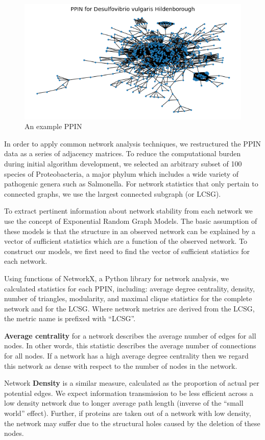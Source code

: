\documentclass[12pt]{article}
\begin{document}
\begin{figure}
\centering
  \includegraphics[width=.5\linewidth]{PPIN_fig1}
  \caption{An example PPIN}
  \label{fig:PPIN_fig1}
\end{figure}

In order to apply common network analysis techniques, we restructured the PPIN data as a series of adjacency matrices. To reduce the computational burden during initial algorithm development, we selected an arbitrary subset of 100 species of Proteobacteria, a major phylum which includes a wide variety of pathogenic genera such as Salmonella. For network statistics that only pertain to connected graphs, we use the largest connected subgraph (or LCSG).

To extract pertinent information about network stability from each network we use the concept of Exponential Random Graph Models. The basic assumption of these models is that the structure in an observed network can be explained by a vector of sufficient statistics which are a function of the observed network. To construct our models, we first need to find the vector of sufficient statistics for each network.

Using functions of NetworkX, a Python library for network analysis, we calculated statistics for each PPIN, including: average degree centrality, density, number of triangles, modularity, and maximal clique statistics for the complete network and for the LCSG. Where network metrics are derived from the LCSG, the metric name is prefixed with ``LCSG''.

\textbf{Average centrality} for a network describes the average number of edges for all nodes. In other words, this statistic describes the average number of connections for all nodes. If a network has a high average degree centrality then we regard this network as dense with respect to the number of nodes in the network.

Network \textbf{Density} is a similar measure, calculated as the proportion of actual per potential edges. We expect information transmission to be less efficient across a low density network due to longer average path length (inverse of the ``small world'' effect). Further, if proteins are taken out of a network with low density, the network may suffer due to the structural holes caused by the deletion of these nodes.
\end{document}
